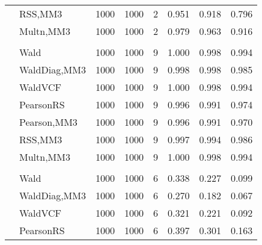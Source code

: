 \documentclass[
]{article}
\begin{document}
\begin{table}[H]
{\begin{tabular}[t]{llrrrrrr}
\hspace{1em} & RSS,MM3 & 1000 & 1000 & 2 & 0.951 & 0.918 & 0.796\\

\hspace{1em} & Multn,MM3 & 1000 & 1000 & 2 & 0.979 & 0.963 & 0.916\\
\cmidrule{1-8}
\addlinespace[0.3em]
\multicolumn{8}{l}{\textbf{1F 15V}}\\
\hspace{1em} & Wald & 1000 & 1000 & 9 & 1.000 & 0.998 & 0.994\\

\hspace{1em} & WaldDiag,MM3 & 1000 & 1000 & 9 & 0.998 & 0.998 & 0.985\\

\hspace{1em} & WaldVCF & 1000 & 1000 & 9 & 1.000 & 0.998 & 0.994\\

\hspace{1em} & PearsonRS & 1000 & 1000 & 9 & 0.996 & 0.991 & 0.974\\

\hspace{1em} & Pearson,MM3 & 1000 & 1000 & 9 & 0.996 & 0.991 & 0.970\\

\hspace{1em} & RSS,MM3 & 1000 & 1000 & 9 & 0.997 & 0.994 & 0.986\\

\hspace{1em} & Multn,MM3 & 1000 & 1000 & 9 & 1.000 & 0.998 & 0.994\\
\cmidrule{1-8}
\addlinespace[0.3em]
\multicolumn{8}{l}{\textbf{2F 10V}}\\
\hspace{1em} & Wald & 1000 & 1000 & 6 & 0.338 & 0.227 & 0.099\\

\hspace{1em} & WaldDiag,MM3 & 1000 & 1000 & 6 & 0.270 & 0.182 & 0.067\\

\hspace{1em} & WaldVCF & 1000 & 1000 & 6 & 0.321 & 0.221 & 0.092\\

\hspace{1em} & PearsonRS & 1000 & 1000 & 6 & 0.397 & 0.301 & 0.163\\


\end{tabular}}
\end{table}
\end{document}
